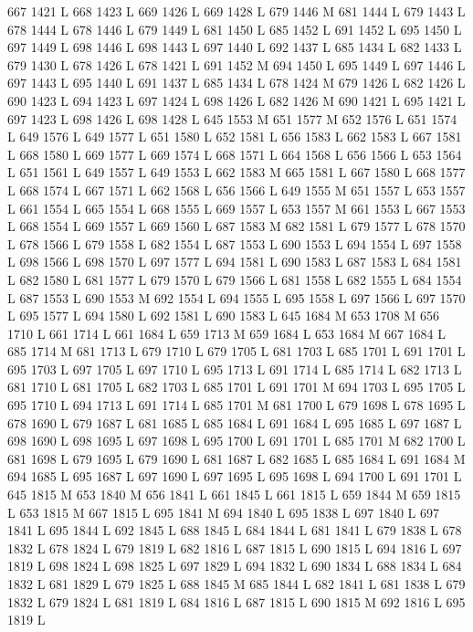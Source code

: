 {{{{{{{{{{{{{{{{{{{{{{{{667 1421 L
668 1423 L
669 1426 L
669 1428 L
679 1446 M 681 1444 L
679 1443 L
678 1444 L
678 1446 L
679 1449 L
681 1450 L
685 1452 L
691 1452 L
695 1450 L
697 1449 L
698 1446 L
698 1443 L
697 1440 L
692 1437 L
685 1434 L
682 1433 L
679 1430 L
678 1426 L
678 1421 L
691 1452 M 694 1450 L
695 1449 L
697 1446 L
697 1443 L
695 1440 L
691 1437 L
685 1434 L
678 1424 M 679 1426 L
682 1426 L
690 1423 L
694 1423 L
697 1424 L
698 1426 L
682 1426 M 690 1421 L
695 1421 L
697 1423 L
698 1426 L
698 1428 L
645 1553 M 651 1577 M 652 1576 L
651 1574 L
649 1576 L
649 1577 L
651 1580 L
652 1581 L
656 1583 L
662 1583 L
667 1581 L
668 1580 L
669 1577 L
669 1574 L
668 1571 L
664 1568 L
656 1566 L
653 1564 L
651 1561 L
649 1557 L
649 1553 L
662 1583 M 665 1581 L
667 1580 L
668 1577 L
668 1574 L
667 1571 L
662 1568 L
656 1566 L
649 1555 M 651 1557 L
653 1557 L
661 1554 L
665 1554 L
668 1555 L
669 1557 L
653 1557 M 661 1553 L
667 1553 L
668 1554 L
669 1557 L
669 1560 L
687 1583 M 682 1581 L
679 1577 L
678 1570 L
678 1566 L
679 1558 L
682 1554 L
687 1553 L
690 1553 L
694 1554 L
697 1558 L
698 1566 L
698 1570 L
697 1577 L
694 1581 L
690 1583 L
687 1583 L
684 1581 L
682 1580 L
681 1577 L
679 1570 L
679 1566 L
681 1558 L
682 1555 L
684 1554 L
687 1553 L
690 1553 M 692 1554 L
694 1555 L
695 1558 L
697 1566 L
697 1570 L
695 1577 L
694 1580 L
692 1581 L
690 1583 L
645 1684 M 653 1708 M 656 1710 L
661 1714 L
661 1684 L
659 1713 M 659 1684 L
653 1684 M 667 1684 L
685 1714 M 681 1713 L
679 1710 L
679 1705 L
681 1703 L
685 1701 L
691 1701 L
695 1703 L
697 1705 L
697 1710 L
695 1713 L
691 1714 L
685 1714 L
682 1713 L
681 1710 L
681 1705 L
682 1703 L
685 1701 L
691 1701 M 694 1703 L
695 1705 L
695 1710 L
694 1713 L
691 1714 L
685 1701 M 681 1700 L
679 1698 L
678 1695 L
678 1690 L
679 1687 L
681 1685 L
685 1684 L
691 1684 L
695 1685 L
697 1687 L
698 1690 L
698 1695 L
697 1698 L
695 1700 L
691 1701 L
685 1701 M 682 1700 L
681 1698 L
679 1695 L
679 1690 L
681 1687 L
682 1685 L
685 1684 L
691 1684 M 694 1685 L
695 1687 L
697 1690 L
697 1695 L
695 1698 L
694 1700 L
691 1701 L
645 1815 M 653 1840 M 656 1841 L
661 1845 L
661 1815 L
659 1844 M 659 1815 L
653 1815 M 667 1815 L
695 1841 M 694 1840 L
695 1838 L
697 1840 L
697 1841 L
695 1844 L
692 1845 L
688 1845 L
684 1844 L
681 1841 L
679 1838 L
678 1832 L
678 1824 L
679 1819 L
682 1816 L
687 1815 L
690 1815 L
694 1816 L
697 1819 L
698 1824 L
698 1825 L
697 1829 L
694 1832 L
690 1834 L
688 1834 L
684 1832 L
681 1829 L
679 1825 L
688 1845 M 685 1844 L
682 1841 L
681 1838 L
679 1832 L
679 1824 L
681 1819 L
684 1816 L
687 1815 L
690 1815 M 692 1816 L
695 1819 L
}}}}}}}}}}}}}}}}}}}}}}}}
